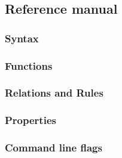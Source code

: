 \subsection{Reference manual}\label{reference-manual}

\subsubsection{Syntax}\label{syntax}

\subsubsection{Functions}\label{functions}

\subsubsection{Relations and Rules}\label{relations-and-rules}

\subsubsection{Properties}\label{properties}

\subsubsection{Command line flags}\label{command-line-flags}
